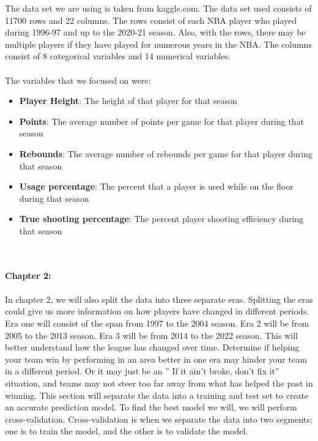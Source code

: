 \documentclass[11pt,letterpaper]{amsart}
\begin{document}
\indent The data set we are using is taken from kaggle.com. The data set used consists of 11700 rows and 22 columns. The rows consist of each NBA player who played during 1996-97  and up to the 2020-21 season. Also, with the rows, there may be multiple players if they have played for numerous years in the NBA. The columns consist of 8 categorical variables and 14 numerical variables.
\\ \\
The variables that we focused on were:
\noindent
\begin{itemize}
\item \textbf{Player Height}: The height of that player for that season
\item \textbf{Points}: The average number of points per game for that player during that season
\item \textbf{Rebounds}: The average number of rebounds per game for that player during that season
\item \textbf{Usage percentage}: The percent that a player is used while on the floor during that season
\item \textbf{True shooting percentage}: The percent player shooting efficiency during that season
\end{itemize}
\cite{4}\\\\

\textbf{Chapter 2:}\\\\
\indent In chapter 2, we will also split the data into three separate eras. Splitting the eras could give us more information on how players have changed in different periods. Era one will consist of the span from 1997 to the 2004 season. Era 2 will be from 2005 to the 2013 season. Era 3 will be from 2014 to the 2022 season. This will better understand how the league has changed over time. Determine if helping your team win by performing in an area better in one era may hinder your team in a different period. Or it may just be an ” If it ain't broke, don't fix it” situation, and teams may not steer too far away from what has helped the past in winning. This section will separate the data into a training and test set to create an accurate prediction model. To find the best model we will, we will perform cross-validation. Cross-validation is when we separate the data into two segments; one is to train the model, and the other is to validate the model.\\
\end{document}
